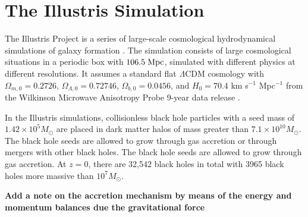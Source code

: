 \section{The Illustris Simulation}

\label{sec:illustris}The Illustris Project is a series of large-scale
cosmological hydrodynamical simulations of galaxy formation \citep{vogelsberger2014properties}.
The simulation consists of large cosmological situations in a periodic
box with $106.5\;{\rm Mpc}$, simulated with different physics at
different resolutions. It assumes a standard flat $\Lambda$CDM cosmology
with $\Omega_{m,0}=0.2726$, $\Omega_{\Lambda,0}=0.72746$, $\Omega_{b,0}=0.0456$,
and $H_{0}=70.4$ km s$^{-1}$ Mpc$^{-1}$ from the Wilkinson Microwave
Anisotropy Probe 9-year data release \citep{hinshaw2013nineyear}.

In the Illustris simulations, collisionless black hole particles with
a seed mass of $1.42\times10^{5}M_{\odot}$ are placed in dark matter
halos of mass greater than $7.1\times10^{10}M_{\odot}$\citep{sijacki2014theillustris}.
The black hole seeds are allowed to grow through gas accretion or
through mergers with other black holes. The black hole seeds are allowed
to grow through gas accretion. At $z=0$, there are 32,542 black holes in total with 3965 black holes more massive than
$10^{7}M_{\odot}$. 

\textbf{Add a note on the accretion mechanism by means of the energy
  and momentum balances due the gravitational force}










